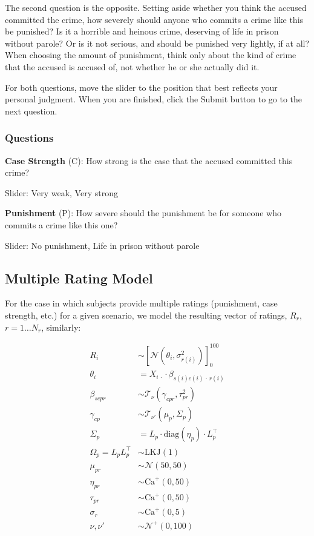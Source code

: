 \documentclass[
]{article}
\begin{document}
The second question is the opposite. Setting aside whether you think the
accused committed the crime, how severely should anyone who commits a
crime like this be punished? Is it a horrible and heinous crime,
deserving of life in prison without parole? Or is it not serious, and
should be punished very lightly, if at all? When choosing the amount of
punishment, think only about the kind of crime that the accused is
accused of, not whether he or she actually did it.

For both questions, move the slider to the position that best reflects
your personal judgment. When you are finished, click the Submit button
to go to the next question.

\hypertarget{questions}{%
\subsubsection{Questions}\label{questions}}

\textbf{Case Strength} (C): How strong is the case that the accused
committed this crime?

Slider: Very weak, Very strong

\textbf{Punishment} (P): How severe should the punishment be for someone
who commits a crime like this one?

Slider: No punishment, Life in prison without parole

\hypertarget{multiple-rating-model}{%
\subsection{Multiple Rating Model}\label{multiple-rating-model}}

For the case in which subjects provide multiple ratings (punishment,
case strength, etc.) for a given scenario, we model the resulting vector
of ratings, \(R_r\), \(r=1\ldots N_r\), similarly:

\begin{align}
  R_i &\sim \left[\mathcal{N}(\theta_i, \sigma^2_{r(i)})\right]^{100}_0 \label{rating_m}\\
  \theta_i &= X_{i \,\cdot} \cdot \beta_{s(i) c(i) \,\cdot \,r(i)} \label{theta_m}\\
  \beta_{s c p r} &\sim \mathcal{T}_{\nu}(\gamma_{c p r}, \tau^2_{p r}) \label{beta_m}\\
  \gamma_{c p} &\sim \mathcal{T}_{\nu'}(\mu_p, \Sigma_p) \label{gamma_m}\\
  \Sigma_p &= L_p \cdot \mathrm{diag}(\eta_p)\cdot L_p^\top \\
  \Omega_p = L_p L_p^\top &\sim \mathrm{LKJ}(1) \label{L_m}\\
  \mu_{p r} &\sim \mathcal{N}(50, 50) \label{mu_m} \\
  \eta_{p r} &\sim \mathrm{Ca}^+(0, 50) \\
  \tau_{p r} &\sim \mathrm{Ca}^+(0, 50) \\
  \sigma_r &\sim \mathrm{Ca}^+(0, 5) \\
  \nu, \nu' &\sim \mathcal{N}^+(0, 100) \label{nu_m}
\end{align}
\end{document}
